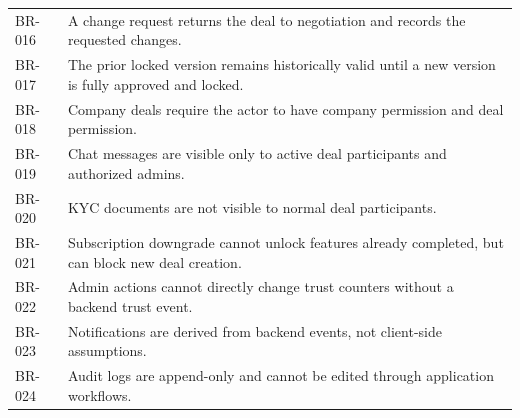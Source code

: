 \begin{longtable}{p{}p{}}
BR-016 & A change request returns the deal to negotiation and records the requested changes. \\
BR-017 & The prior locked version remains historically valid until a new version is fully approved and locked. \\
BR-018 & Company deals require the actor to have company permission and deal permission. \\
BR-019 & Chat messages are visible only to active deal participants and authorized admins. \\
BR-020 & KYC documents are not visible to normal deal participants. \\
BR-021 & Subscription downgrade cannot unlock features already completed, but can block new deal creation. \\
BR-022 & Admin actions cannot directly change trust counters without a backend trust event. \\
BR-023 & Notifications are derived from backend events, not client-side assumptions. \\
BR-024 & Audit logs are append-only and cannot be edited through application workflows. \\
\bottomrule
\end{longtable}

